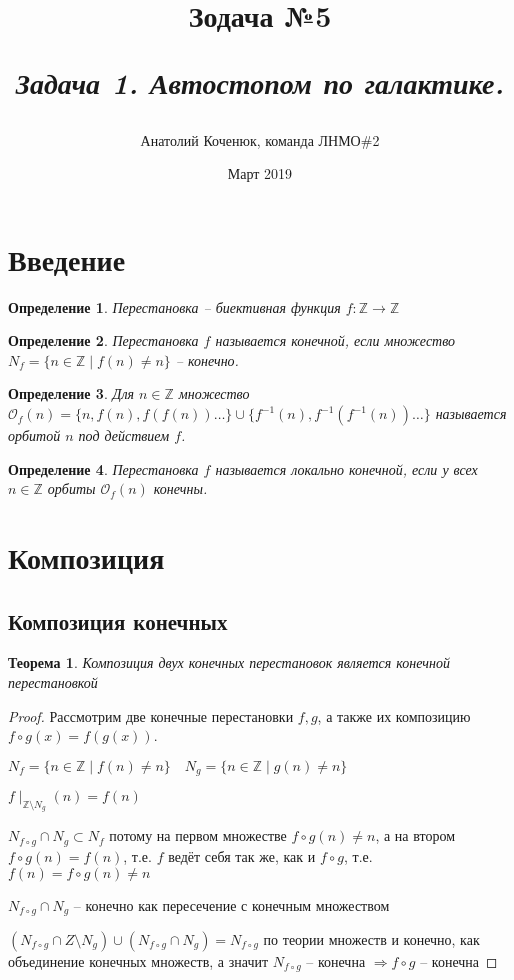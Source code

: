 \documentclass[12pt,a4paper, flushleft]{article}
\author{Анатолий Коченюк, команда ЛНМО\#2}
\date{Март 2019}
\title{Зодача \textsuperscript{\textregistered} №5}
\title{
	\vspace{4cm}	
	\horline{470}	
	\begin{center}
		\begin{Huge}
			\textbf{\emph{Задача 1. Автостопом по галактике.}}
		\end{Huge}
	\end{center}	
	\vspace{-1.3cm}	
	\horline{480}
}
\newtheorem{Def}{Определение}[section]
\newtheorem{Th}{Теорема}[section]
\begin{document}
\maketitle

\pagebreak

\tableofcontents	
	
\pagebreak
\section*{Введение}

\begin{Def}
	Перестановка -- биективная функция $f: \mathds{Z}\to \mathds{Z}$
\end{Def}

\begin{Def}
	Перестановка $f$ называется конечной, если множество\\ $N_f = \{n\in\mathds{Z}\mid f(n)\neq n\}$ -- конечно.
\end{Def}

\begin{Def}
	Для $n\in\mathds{Z}$ множество $\mathcal{O}_f(n) = \{n, f(n), f(f(n))\dots\}\cup \{f^{-1}(n), f^{-1}(f^{-1}(n))\dots\}$ называется орбитой $n$ под действием $f$.
\end{Def}

\begin{Def}
	Перестановка $f$ называется локально конечной, если у всех $n\in\mathds{Z}$ орбиты $\mathcal{O}_f(n)$ конечны.
\end{Def}

\section{Композиция}
\subsection{Композиция конечных}
\begin{Th}
	Композиция двух конечных перестановок является конечной перестановкой
\end{Th}
\begin{proof}
	Рассмотрим две конечные перестановки $f, g$, а также их композицию $f\circ g (x) = f(g(x))$. 
	
	$N_f = \{n\in\mathds{Z}\mid f(n)\neq n\}\quad N_g = \{n\in\mathds{Z}\mid g(n)\neq n\}$
	
	$f\mid_{\mathds{Z}\setminus N_g} (n) = f(n)$
	
	$N_{f\circ g}\cap N_g\subset N_f$ потому на первом множестве $f\circ g(n)\neq n$, а на втором $f\circ g(n) = f(n)$, т.е. $f$ ведёт себя так же, как и $f\circ g$, т.е. $f(n) = f\circ g(n)\neq n$
	
	$N_{f\circ g}\cap N_g$ -- конечно как пересечение с конечным множеством
	
	$(N_{f\circ g}\cap Z\setminus N_g) \cup (N_{f\circ g}\cap N_g) = N_{f\circ g}$ по теории множеств и конечно, как объединение конечных множеств, а значит $N_{f\circ g}$ -- конечна $\Rightarrow f\circ g$ -- конечна
\end{proof}
\end{document}
